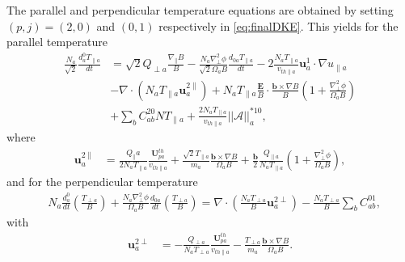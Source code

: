 {{The parallel and perpendicular temperature equations are obtained by setting $(p,j)=(2,0)$ and $(0,1)$ respectively in \cref{eq:finalDKE}. This yields for the parallel temperature
%
\begin{equation}
    \begin{split}
        \frac{N_a}{\sqrt{2}}\frac{d_a^0 T_{\parallel a}}{dt} &=
        \sqrt{2} Q_{\perp a} \frac{\nabla_\parallel B}{B}- \frac{N_a \nabla_\perp^2 \phi}{\sqrt{2}\Omega_a B}\frac{d_{0a} T_{\parallel a}}{dt}-2\frac{N_a T_{\parallel a}}{v_{th\parallel a}}\mathbf u_a^{1} \cdot \nabla u_{\parallel a}\\
        &-\nabla \cdot (N_a T_{\parallel a} \mathbf u_a^{2\parallel})+ N_a T_{\parallel a}\frac{\mathbf E}{B}\cdot \frac{\mathbf b \times \nabla B}{B}\left(1+\frac{\nabla_\perp^2 \phi}{\Omega_a B}\right)\\
        &+\sum_b C_{ab}^{20}N T_{\parallel a} +\frac{2 N_a T_{\parallel a}}{v_{th\parallel a}}||\mathcal{A}||_a^{*10},
    \end{split}
\label{eq:paralleltempc}
\end{equation}
%
where
%
\begin{equation}
    \begin{split}
        \mathbf u_a^{2\parallel}&= \frac{Q_\parallel a}{2 N_a T_{\parallel a}}\frac{\mathbf U_{pa}^{th}}{v_{th\parallel a}}+\frac{\sqrt{2}T_{\parallel a}}{m_a}\frac{\mathbf b \times \nabla B}{\Omega_a B}+\frac{\mathbf b}{2}\frac{Q_{\parallel a} }{N_a T_{\parallel a} }\left(1+\frac{\nabla_\perp^2 \phi}{\Omega_a B}\right),
    \end{split}
\end{equation}
%
and for the perpendicular temperature
%
\begin{equation}
    \begin{split}
        &N_a\frac{d_a^0 }{dt}\left(\frac{T_{\perp a}}{B}\right)+\frac{N_a\nabla_\perp^2 \phi}{\Omega_a B}\frac{d_{0 a} }{dt}\left(\frac{T_{\perp a}}{B}\right) =\nabla \cdot \left(\frac{N_a T_{\perp a}}{B} \mathbf u_a^{2\perp}\right)-\frac{ N_a T_{\perp a}}{B}\sum_b  C_{ab}^{01},
    \end{split}
    \label{eq:perptempc}
\end{equation}
%
with
%
\begin{equation}
    \begin{split}
        \mathbf u_a^{2\perp}&=-\frac{Q_{\perp a}}{N_a T_{\perp a}}\frac{\mathbf U_{pa}^{th}}{v_{th\parallel a}}-\frac{T_{\perp a}}{m_a}\frac{\mathbf b \times \nabla B}{\Omega_a B}.
    \end{split}

\end{equation}}}
